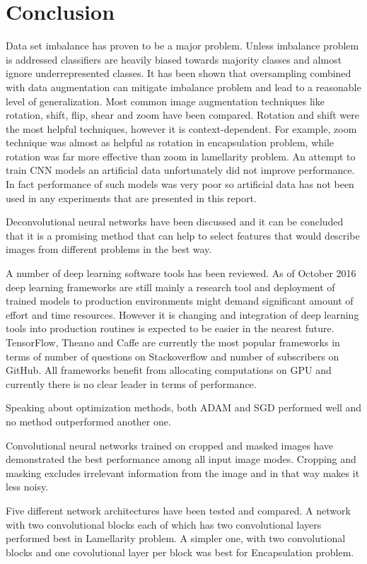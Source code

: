 \documentclass[a4paper, 11pt, table]{article}
\begin{document}
\newpage
\section{Conclusion}

Data set imbalance has proven to be a major problem. Unless imbalance problem is addressed classifiers are heavily biased towards majority classes and almost ignore underrepresented classes. It has been shown that oversampling combined with data augmentation can mitigate imbalance problem and lead to a reasonable level of generalization. Most common image augmentation techniques like rotation, shift, flip, shear and zoom have been compared. Rotation and shift were the most helpful techniques, however it is context-dependent. For example, zoom technique was almost as helpful as rotation in encapsulation problem, while rotation was far more effective than zoom in lamellarity problem. An attempt to train CNN models an artificial data unfortunately did not improve performance. In fact performance of such models was very poor so artificial data has not been used in any experiments that are presented in this report. 

Deconvolutional neural networks have been discussed and it can be concluded that it is a promising method that can help to select features that would describe images from different problems in the best way.  

A number of deep learning software tools has been reviewed. As of October 2016 deep learning frameworks are still mainly a research tool and deployment of trained models to production environments might demand significant amount of effort and time resources. However it is changing and integration of deep learning tools into production routines is expected to be easier in the nearest future. TensorFlow, Theano and Caffe are currently the most popular frameworks in terms of number of questions on Stackoverflow and number of subscribers on GitHub. All frameworks benefit from allocating computations on GPU and currently there is no clear leader in terms of performance. 

Speaking about optimization methods, both ADAM and SGD performed well and no method outperformed another one.

Convolutional neural networks trained on cropped and masked images have demonstrated the best performance among all input image modes. Cropping and masking excludes irrelevant information from the image and in that way makes it less noisy. 

Five different network architectures have been tested and compared. A network with two convolutional blocks each of which has two convolutional layers performed best in Lamellarity problem. A simpler one, with two convolutional blocks and one covolutional layer per block was best for Encapsulation problem. 
\end{document}
